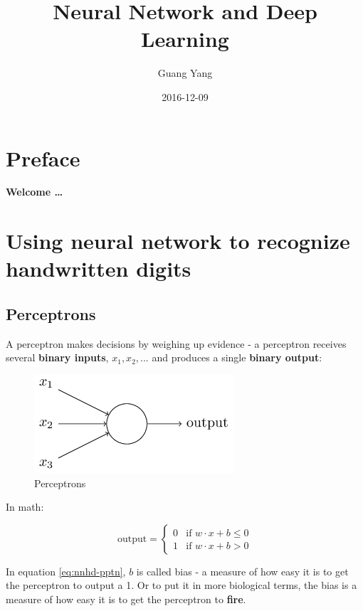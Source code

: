 \documentclass[]{book}
\title{Neural Network and Deep Learning}
\author{Guang Yang}
\date{2016-12-09}
\begin{document}
\maketitle

{
\setcounter{tocdepth}{1}
\tableofcontents
}
\chapter*{Preface}\label{preface}

\textbf{Welcome \ldots{}}

\chapter{Using neural network to recognize handwritten
digits}\label{nnhd}

\section{Perceptrons}\label{perceptrons}

A perceptron makes decisions by weighing up evidence - a perceptron
receives several \textbf{binary inputs}, \(x_1, x_2, ...\) and produces
a single \textbf{binary output}:

\begin{figure}

{\centering \includegraphics[width=0.3\linewidth]{fig/01_tikz00} 

}

\caption{Perceptrons}\label{fig:nnhd-pptn}
\end{figure}

In math:

\begin{equation}
\mbox{output} = \left\{ 
  \begin{array}{ll} 
    0 & \mbox{if } w\cdot x + b \leq 0 \\
    1 & \mbox{if } w\cdot x + b > 0
  \end{array}
\right.
\label{eq:nnhd-pptn}
\end{equation}

In equation \eqref{eq:nnhd-pptn}, \(b\) is called bias - a measure of how
easy it is to get the perceptron to output a 1. Or to put it in more
biological terms, the bias is a measure of how easy it is to get the
perceptron to \textbf{fire}.
\end{document}
